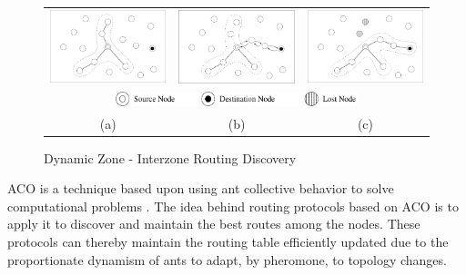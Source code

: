 \documentclass[conference]{IEEEtran}
\begin{document}
\begin{figure}[htb]
\centering
\begin{tabular}{c c c}
\includegraphics[width=140pt]{fig/dynamic_zone_part_1.pdf} &
\includegraphics[width=140pt]{fig/dynamic_zone_part_2.pdf} &
\includegraphics[width=140pt]{fig/dynamic_zone_part_3.pdf} \\
\multicolumn{3}{c}{ \includegraphics[width=200pt]{fig/dynamic_zone_subtitle.pdf} } \\
(a) & (b) & (c) \\
\end{tabular}
\caption{Dynamic Zone - Interzone Routing Discovery}
\label{dynamic}
\end{figure}

ACO is a technique based upon using ant collective behavior to solve computational problems \cite{Dorigo:2005, Dorigo:2006}.
The idea behind routing protocols based on ACO is to apply it to discover and maintain the best routes among the nodes.
These protocols can thereby maintain the routing table efficiently updated due to the proportionate dynamism of ants to adapt, by pheromone, to topology changes.
\end{document}
